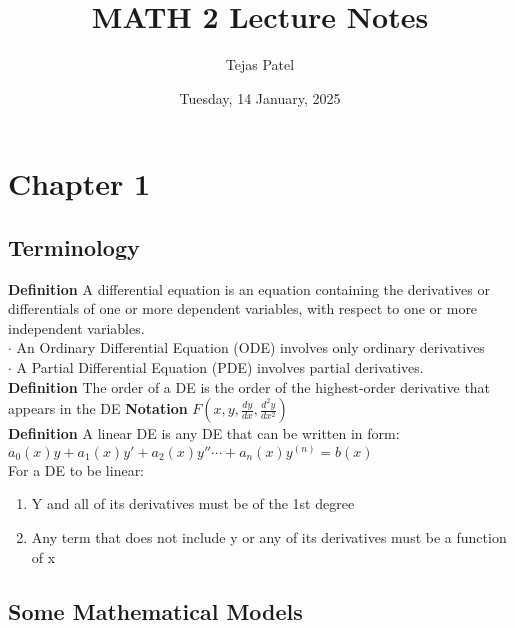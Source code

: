 \documentclass{article}
\title{MATH 2 Lecture Notes}
\date{Tuesday, 14 January, 2025}
\author{Tejas Patel}
\begin{document}
\maketitle
\tableofcontents
\pagebreak
\section{Chapter 1}
\subsection{Terminology}
\textbf{Definition} A differential equation is an equation containing the derivatives or differentials 
of one or more dependent variables, with respect to one or more independent variables.\\
\textbf{$\cdot$} An Ordinary Differential Equation (ODE) involves only ordinary derivatives\\
\textbf{$\cdot$} A Partial Differential Equation (PDE) involves partial derivatives.\\
\textbf{Definition} The order of a DE is the order of the highest-order derivative that appears in the DE
\textbf{Notation} $F(x,y,\frac{dy}{dx}, \frac{d^2y}{dx^2})$\\
\textbf{Definition} A linear DE is any DE that can be written in form:\\
${\displaystyle a_{0}(x)y+a_{1}(x)y'+a_{2}(x)y''\cdots +a_{n}(x)y^{(n)}=b(x)}$\\
For a DE to be linear:
\begin{enumerate}
    \item Y and all of its derivatives must be of the 1st degree
    \item Any term that does not include y or any of its derivatives must be a function of x
\end{enumerate}
\subsection{Some Mathematical Models}
\end{document}
